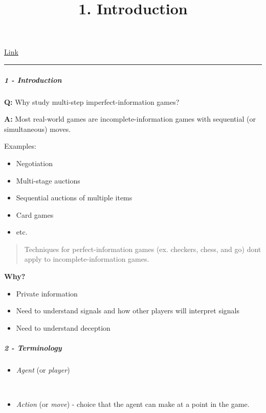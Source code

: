\documentclass[
]{article}
\title{1. Introduction}
\author{}
\date{}
\providecommand{\tightlist}{%
  \setlength{\itemsep}{0pt}\setlength{\parskip}{0pt}}
\begin{document}
\maketitle

\href{https://www.cs.cmu.edu/~sandholm/cs15-888F21/lecture1.pdf}{Link}

\begin{center}\rule{0.5\linewidth}{0.5pt}\end{center}

\subparagraph{1 - Introduction}\label{introduction}

\textbf{Q:} Why study multi-step imperfect-information games?

\textbf{A:} Most real-world games are incomplete-information games with
sequential (or simultaneous) moves.

Examples:

\begin{itemize}
\tightlist
\item
  Negotiation
\item
  Multi-stage auctions
\item
  Sequential auctions of multiple items
\item
  Card games
\item
  etc.
\end{itemize}

\begin{quote}
Techniques for perfect-information games (ex. checkers, chess, and go)
don\textquotesingle t apply to incomplete-information games.
\end{quote}

\textbf{Why?}

\begin{itemize}
\tightlist
\item
  Private information
\item
  Need to understand signals and how other players will interpret
  signals
\item
  Need to understand deception
\end{itemize}

\subparagraph{2 - Terminology}\label{terminology}

\begin{itemize}
\tightlist
\item
  {\emph{Agent}} (or \emph{player})\\
  \strut \\
\item
  {\emph{Action}} (or \emph{move}) - choice that the agent can make at a
  point in the game.\\
  \strut \\
\end{itemize}
\end{document}
